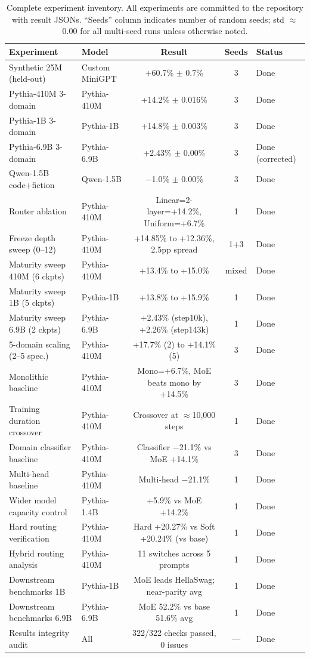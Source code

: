 \documentclass{article}
\begin{document}
\begin{table}[h]
\centering
\caption{Complete experiment inventory. All experiments are committed to the repository with result JSONs. ``Seeds'' column indicates number of random seeds; std $\approx$0.00 for all multi-seed runs unless otherwise noted.}
\label{tab:inventory}
\small
\begin{tabular}{llccl}
\toprule
\textbf{Experiment} & \textbf{Model} & \textbf{Result} & \textbf{Seeds} & \textbf{Status} \\
\midrule
Synthetic 25M (held-out) & Custom MiniGPT & +60.7\% $\pm$ 0.7\% & 3 & Done \\
Pythia-410M 3-domain & Pythia-410M & +14.2\% $\pm$ 0.016\% & 3 & Done \\
Pythia-1B 3-domain & Pythia-1B & +14.8\% $\pm$ 0.003\% & 3 & Done \\
Pythia-6.9B 3-domain & Pythia-6.9B & +2.43\% $\pm$ 0.00\% & 3 & Done (corrected) \\
Qwen-1.5B code+fiction & Qwen-1.5B & $-$1.0\% $\pm$ 0.00\% & 3 & Done \\
Router ablation & Pythia-410M & Linear=2-layer=+14.2\%, Uniform=+6.7\% & 1 & Done \\
Freeze depth sweep (0--12) & Pythia-410M & +14.85\% to +12.36\%, 2.5pp spread & 1+3 & Done \\
Maturity sweep 410M (6 ckpts) & Pythia-410M & +13.4\% to +15.0\% & mixed & Done \\
Maturity sweep 1B (5 ckpts) & Pythia-1B & +13.8\% to +15.9\% & 1 & Done \\
Maturity sweep 6.9B (2 ckpts) & Pythia-6.9B & +2.43\% (step10k), +2.26\% (step143k) & 1 & Done \\
5-domain scaling (2--5 spec.) & Pythia-410M & +17.7\% (2) to +14.1\% (5) & 3 & Done \\
Monolithic baseline & Pythia-410M & Mono=+6.7\%, MoE beats mono by +14.5\% & 3 & Done \\
Training duration crossover & Pythia-410M & Crossover at $\approx$10,000 steps & 1 & Done \\
Domain classifier baseline & Pythia-410M & Classifier $-$21.1\% vs MoE +14.1\% & 3 & Done \\
Multi-head baseline & Pythia-410M & Multi-head $-$21.1\% & 1 & Done \\
Wider model capacity control & Pythia-1.4B & +5.9\% vs MoE +14.2\% & 1 & Done \\
Hard routing verification & Pythia-410M & Hard +20.27\% vs Soft +20.24\% (vs base) & 1 & Done \\
Hybrid routing analysis & Pythia-410M & 11 switches across 5 prompts & 1 & Done \\
Downstream benchmarks 1B & Pythia-1B & MoE leads HellaSwag; near-parity avg & 1 & Done \\
Downstream benchmarks 6.9B & Pythia-6.9B & MoE 52.2\% vs base 51.6\% avg & 1 & Done \\
Results integrity audit & All & 322/322 checks passed, 0 issues & --- & Done \\
\bottomrule
\end{tabular}
\end{table}
\end{document}

